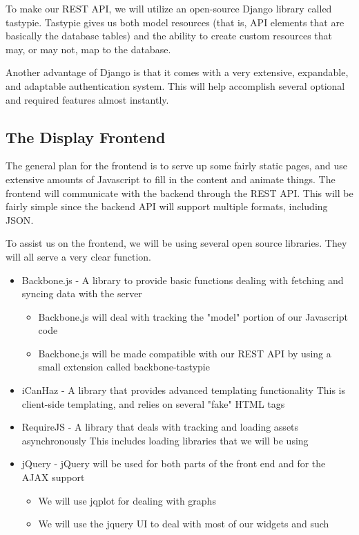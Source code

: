 To make our \ac{REST} \ac{API}, we will utilize an open-source Django library called tastypie.
Tastypie gives us both model resources (that is, \ac{API} elements that are basically the database tables) and the ability to create custom resources that may, or may not, map to the database.

Another advantage of Django is that it comes with a very extensive, expandable, and adaptable authentication system.
This will help accomplish several optional and required features almost instantly.


\subsection{The Display Frontend}

The general plan for the frontend is to serve up some fairly static pages, and use extensive amounts of Javascript to fill in the content and animate things.
The frontend will communicate with the backend through the \ac{REST} \ac{API}.
This will be fairly simple since the backend \ac{API} will support multiple formats, including \ac{JSON}.

To assist us on the frontend, we will be using several open source libraries.
They will all serve a very clear function.

\begin{itemize}
 \item Backbone.js - A library to provide basic functions dealing with fetching and syncing data with the server
 \begin{itemize}
  \item Backbone.js will deal with tracking the "model" portion of our Javascript code
  \item Backbone.js will be made compatible with our \ac{REST} \ac{API} by using a small extension called backbone-tastypie
 \end{itemize}
 \item iCanHaz - A library that provides advanced templating functionality
This is client-side templating, and relies on several "fake" \ac{HTML} tags
 \item RequireJS - A library that deals with tracking and loading assets asynchronously
This includes loading libraries that we will be using
 \item jQuery - jQuery will be used for both parts of the front end and for the AJAX support
 \begin{itemize}
  \item We will use jqplot for dealing with graphs
  \item We will use the jquery UI to deal with most of our widgets and such
 \end{itemize}
\end{itemize}


